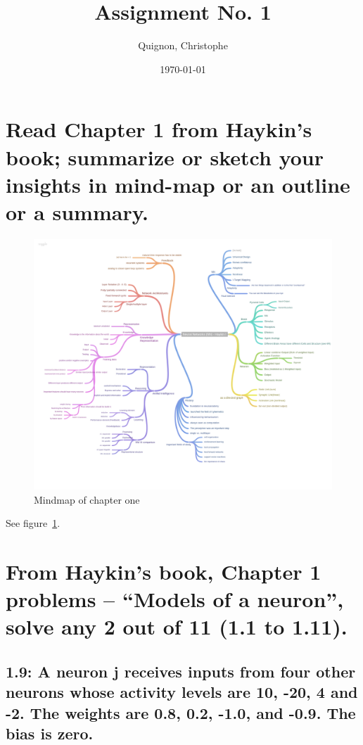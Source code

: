 \documentclass{scrartcl}
\begin{document}
\title{Assignment No. 1}
\subtitle{}
\author{
  Quignon, Christophe \\
} 
\date{\today}


\maketitle

\section{Read Chapter 1 from Haykin’s book; summarize or sketch your insights in mind-map or an outline or a summary.}

\begin{figure}
 \center
 \includegraphics[width= \textwidth]{mindmap.png}
 \caption{Mindmap of chapter one}
 \label{fig:mindmap}
\end{figure}

See figure~\ref{fig:mindmap}.


\section{From Haykin’s book, Chapter 1 problems – “Models of a neuron”, solve any 2 out of 11
(1.1 to 1.11).
}
\subsection{1.9: A neuron j receives inputs from four other neurons whose activity levels are 10, -20, 4 and -2. The weights are 0.8, 0.2, -1.0, and -0.9. The bias is zero.}
\end{document}

